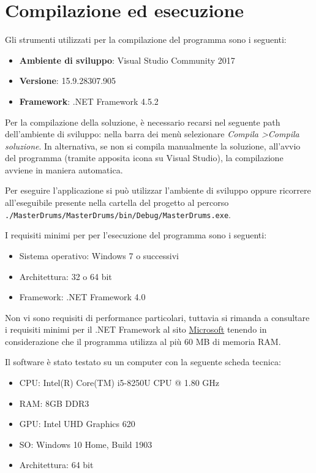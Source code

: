 \section{Compilazione ed esecuzione}
    \vspace{1cm}
    Gli strumenti utilizzati per la compilazione del programma sono i seguenti:
    \vspace{0.3cm}
    \begin{itemize}
        \item \textbf{Ambiente di sviluppo}: Visual Studio Community 2017
        \item \textbf{Versione}: 15.9.28307.905
        \item \textbf{Framework}: .NET Framework 4.5.2
    \end{itemize}
    \vspace{1cm}
    Per la compilazione della soluzione, è necessario recarsi nel seguente path dell'ambiente di sviluppo: nella barra dei menù selezionare \emph{Compila \textgreater  Compila soluzione}. In alternativa, se non si compila manualmente la soluzione, all'avvio del programma (tramite apposita icona su Visual Studio), la compilazione avviene in maniera automatica.
    \vspace{0.3cm}
    
    Per eseguire l’applicazione si può utilizzar l'ambiente di sviluppo oppure ricorrere all'eseguibile presente nella cartella del progetto al percorso \texttt{./MasterDrums/MasterDrums/bin/Debug/MasterDrums.exe}.
    
    \vspace{1cm}
    
    I requisiti minimi per per l'esecuzione del programma sono i seguenti:
    \begin{itemize}
        \item Sistema operativo: Windows 7 o successivi
        \item Architettura: 32 o 64 bit
        \item Framework: .NET Framework 4.0
    \end{itemize}
    
    \vspace{0.5cm}
    Non vi sono requisiti di performance particolari, tuttavia si rimanda a consultare i requisiti minimi per il .NET Framework al sito \hyperlink{https://docs.microsoft.com/dotnet/framework/get-started/system-requirements}{Microsoft} tenendo in considerazione che il programma utilizza al più 60 MB di memoria RAM.
    
    \vspace{1cm}
    Il software è stato testato su un computer con la seguente scheda tecnica:
    \begin{itemize}
        \item CPU: Intel(R) Core(TM) i5-8250U CPU @ 1.80 GHz 
        \item RAM: 8GB DDR3
        \item GPU: Intel UHD Graphics 620
        \item SO: Windows 10 Home, Build 1903
        \item Architettura: 64 bit
    \end{itemize}